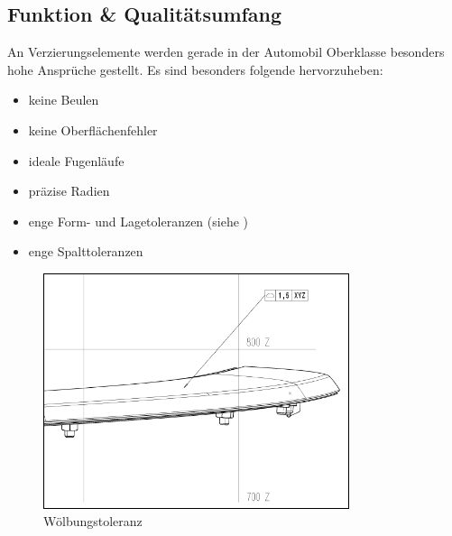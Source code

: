 \documentclass[12pt,a4paper,parskip]{scrartcl}
\begin{document}
	 	 
\subsection{Funktion \& Qualitätsumfang}
An Verzierungselemente werden gerade in der Automobil Oberklasse besonders hohe Ansprüche gestellt. Es sind besonders folgende hervorzuheben:
\begin{itemize}
\item keine Beulen
\item keine Oberflächenfehler
\item ideale Fugenläufe
\item präzise Radien
\item enge Form- und Lagetoleranzen (siehe )
\item enge Spalttoleranzen
\end{itemize}
\begin{figure}[hbtp]
  \centering
  \includegraphics[width=0.8\textwidth]{vdkdtol}
  \caption{Wölbungstoleranz}
  \label{fig:vdkdtol}
  \end{figure}
  
\end{document}
